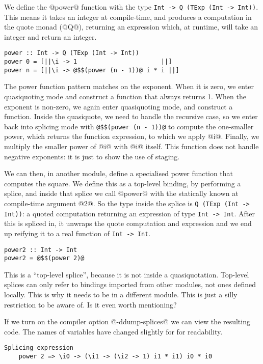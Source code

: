 We define the @power@ function with the type \lstinline/Int -> Q (TExp (Int -> Int))/. This means it takes an integer at compile-time, and produces a computation in the quote monad (@Q@), returning an expression which, at runtime, will take an integer and return an integer.

\begin{lstlisting}
power :: Int -> Q (TExp (Int -> Int))
power 0 = [||\i -> 1                       ||]
power n = [||\i -> @$$(power (n - 1))@ i * i ||]
\end{lstlisting}

The power function pattern matches on the exponent.
When it is zero, we enter quasiquoting mode and construct a function that always returns 1.
When the exponent is non-zero, we again enter quasiquoting mode, and construct a function.
Inside the quasiquote, we need to handle the recursive case, so we enter back into splicing mode with \lstinline/@$$(power (n - 1))@/ to compute the one-smaller power, which returns the function expression, to which we apply @i@. Finally, we multiply the smaller power of @i@ with @i@ itself.
This function does not handle negative exponents: it is just to show the use of staging.

We can then, in another module, define a specialised power function that computes the square.
We define this as a top-level binding, by performing a splice, and inside that splice we call @power@ with the statically known at compile-time argument @2@.
So the type inside the splice is \lstinline/Q (TExp (Int -> Int))/: a quoted computation returning an expression of type \lstinline/Int -> Int/.
After this is spliced in, it unwraps the quote computation and expression and we end up reifying it to a real function of \lstinline/Int -> Int/.

\begin{lstlisting}
power2 :: Int -> Int
power2 = @$$(power 2)@
\end{lstlisting}

This is a ``top-level splice'', because it is not inside a quasiquotation.
Top-level splices can only refer to bindings imported from other modules, not ones defined locally.
This is why it needs to be in a different module.
This is just a silly restriction to be aware of. Is it even worth mentioning?

If we turn on the compiler option @-ddump-splices@ we can view the resulting code.
The names of variables have changed slightly for for readability.

\begin{lstlisting}
Splicing expression
    power 2 => \i0 -> (\i1 -> (\i2 -> 1) i1 * i1) i0 * i0
\end{lstlisting}

